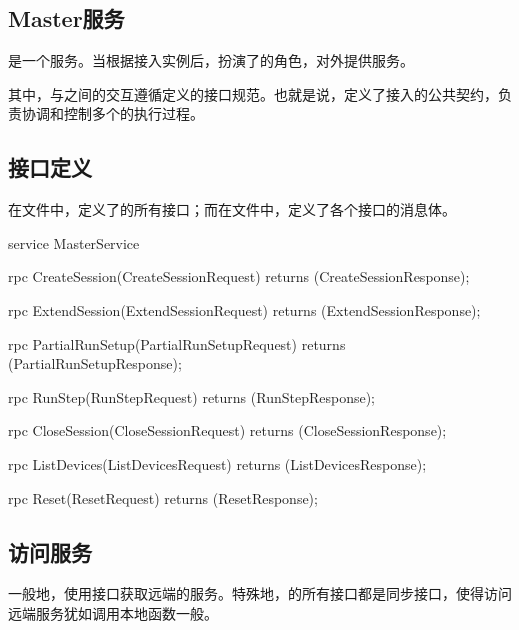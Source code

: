 \begin{content}
\section{Master服务}

\begin{content}

是一个服务。当根据接入实例后，扮演了的角色，对外提供服务。

其中，与之间的交互遵循定义的接口规范。也就是说，定义了接入的公共契约，负责协调和控制多个的执行过程。

\subsection{接口定义}

在文件中，定义了的所有接口；而在文件中，定义了各个接口的消息体。

\begin{leftbar}
\begin{c++}
service MasterService {
  rpc CreateSession(CreateSessionRequest) 
      returns (CreateSessionResponse);
  
  rpc ExtendSession(ExtendSessionRequest) 
      returns (ExtendSessionResponse);

  rpc PartialRunSetup(PartialRunSetupRequest) 
      returns (PartialRunSetupResponse);

  rpc RunStep(RunStepRequest) 
      returns (RunStepResponse);
  
  rpc CloseSession(CloseSessionRequest) 
      returns (CloseSessionResponse);
  
  rpc ListDevices(ListDevicesRequest) 
      returns (ListDevicesResponse);

  rpc Reset(ResetRequest) 
      returns (ResetResponse);
}
\end{c++}
\end{leftbar}

\subsection{访问服务}

一般地，使用接口获取远端的服务。特殊地，的所有接口都是同步接口，使得访问远端服务犹如调用本地函数一般。


\end{content}
\end{content}
